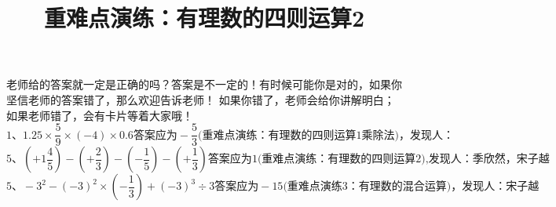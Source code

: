 \documentclass[fleqn]{article}
\title{重难点演练：有理数的四则运算2}
\begin{document}
  \hspace{6cm}{\Large 错误答案修正}
  
	\noindent 老师给的答案就一定是正确的吗？答案是不一定的！有时候可能你是对的，如果你坚信老师的答案错了，那么欢迎告诉老师！
	如果你错了，老师会给你讲解明白；如果老师错了，会有卡片等着大家哦！
  \[\text{1、}1.25\times\frac59\times(-4)\times0.6 \text{答案应为}-\frac53 \text{(重难点演练：有理数的四则运算1乘除法)，发现人：}\]
  \[\text{5、} (+1\frac45)-(+\frac23)-(-\frac15)-(+\frac13)\text{答案应为}1\text{(重难点演练：有理数的四则运算2),发现人：季欣然，宋子越}\]
  \[\text{5、}-3^2-(-3)^2\times(-\frac13)+(-3)^3\div3\text{答案应为}-15\text{(重难点演练3：有理数的混合运算)，发现人：宋子越}\]
\end{document}
